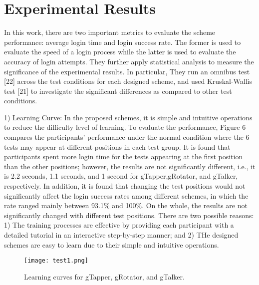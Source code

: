 \documentclass[12pt,a4paper,oneside]{report}
\begin{document}
\section{Experimental Results}

In this work, there are two important metrics to evaluate
the scheme performance: average login time and login success
rate. The former is used to evaluate the speed of a login
process while the latter is used to evaluate the accuracy of
login attempts. They further apply statistical analysis to measure
the significance of the experimental results. In particular,
They run an omnibus test [22] across the test conditions for
each designed scheme, and used Kruskal-Wallis test [21] to
investigate the significant differences as compared to other test
conditions.
\par 
1) Learning Curve: In the proposed schemes, it is simple and
intuitive operations to reduce the difficulty level of learning. To evaluate the performance, Figure 6 compares the
participants’ performance under the normal condition where
the 6 tests may appear at different positions in each test
group. It is found that participants spent more login time
for the tests appearing at the first position than the other
positions; however, the results are not significantly different,
i.e., it is 2.2 seconds, 1.1 seconds, and 1 second for gTapper,gRotator, and gTalker, respectively. In addition, it is found
that changing the test positions would not significantly affect
the login success rates among different schemes, in which
the rate ranged mainly between 93.1\% and 100\%. On the
whole, the results are not significantly changed with different
test positions. There are two possible reasons: 1) The training
processes are effective by providing each participant with a
detailed tutorial in an interactive step-by-step manner; and
2) THe designed schemes are easy to learn due to their simple
and intuitive operations.

\begin{figure}[H]
    \begin{center}
        \label{abc}
            \texttt{[image: test1.png]}
            \caption{ Learning curves for gTapper, gRotator, and gTalker.}
    \end{center}
\end{figure}
\end{document}
